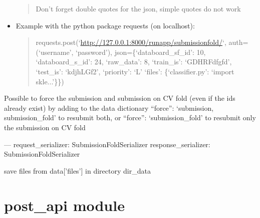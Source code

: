 \documentclass[letterpaper,10pt,english]{sphinxmanual}
\begin{document}
\begin{fulllineitems}
\begin{fulllineitems}
\begin{itemize}
\begin{quote}
Don't forget double quotes for the json, simple quotes do not work
\end{quote}

\item {} 
Example with the python package requests (on localhost):
\begin{quote}

requests.post(`\url{http://127.0.0.1:8000/runapp/submissionfold/}`,                          auth=(`username', `password'),                          json=\{`databoard\_sf\_id': 10, `databoard\_s\_id': 24,                                `raw\_data': 8, `train\_is': `GDHRFdfgfd',                                `test\_is': `kdjhLGf2', `priority': `L'                                `files': \{`classifier.py': `import skle...'\}\})
\end{quote}

\end{itemize}

Possible to force the submission and submission on CV fold (even if the        ids already exist) by adding to the data dictionary         ``force'': `submission, submission\_fold' to resubmit both, or         ``force'': `submission\_fold' to resubmit only the submission on CV fold

---
request\_serializer: SubmissionFoldSerializer
response\_serializer: SubmissionFoldSerializer

\end{fulllineitems}


\end{fulllineitems}


\begin{fulllineitems}
\label{modules/views:runapp.views.save_files}
save files from data{[}'files'{]} in directory dir\_data

\end{fulllineitems}



\section{post\_api module}
\label{modules/views:requestsmodule}\label{modules/views:module-test_files.post_api}\label{modules/views:post-api-module}
\end{document}
